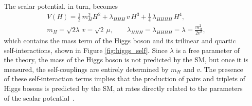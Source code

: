 \noindent The scalar potential, in turn, becomes
%
\begin{equation}
    \begin{gathered}
    V(H) = \frac{1}{2}\, m_H^2 H^2 + \lambda_{HHH}\, v\, H^3 + \frac{1}{4}\, \lambda_{HHHH}\, H^4, \\
    m_H = \sqrt{2\lambda}\,v = \sqrt{2}\,\mu, \qquad \lambda_{HHH} = \lambda_{HHHH} = \lambda = \frac{m_H^2}{2v^2},
    \end{gathered}
    \label{higgs_pot}
\end{equation}
%
which contains the mass term of the Higgs boson and its trilinear and quartic self-interactions, shown in Figure \ref{fig:higgs_self}. Since $\lambda$ is a free parameter of the theory, the mass of the Higgs boson is not predicted by the SM, but once it is measured, the self-couplings are entirely determined by $m_H$ and $v$. The presence of these self-interaction terms implies that the production of pairs and triplets of Higgs bosons is predicted by the SM, at rates directly related to the parameters of the scalar potential~\cite{DiMicco:2019ngk}.
